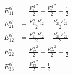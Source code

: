 \begin{align}
E^{\mathrm el}_{11} &= \frac{{F_{11}^{\mathrm{el}}}^2}{2}+\frac{{F_{21}^{\mathrm{el}}}^2}{2}-\frac{1}{2} \\ 
E^{\mathrm el}_{21} &= \frac{F_{11}^{\mathrm{el}}\,F_{12}^{\mathrm{el}}}{2}+\frac{F_{21}^{\mathrm{el}}\,F_{22}^{\mathrm{el}}}{2} \\ 
E^{\mathrm el}_{12} &= \frac{F_{11}^{\mathrm{el}}\,F_{12}^{\mathrm{el}}}{2}+\frac{F_{21}^{\mathrm{el}}\,F_{22}^{\mathrm{el}}}{2} \\ 
E^{\mathrm el}_{22} &= \frac{{F_{12}^{\mathrm{el}}}^2}{2}+\frac{{F_{22}^{\mathrm{el}}}^2}{2}-\frac{1}{2} \\ 
E^{\mathrm el}_{33} &= \frac{{F_{33}^{\mathrm{el}}}^2}{2}-\frac{1}{2} 
\end{align}
